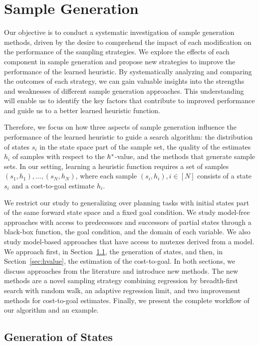 \chapter{Sample Generation}
\label{sec:sampling}

Our objective is to conduct a systematic investigation of sample generation methods, driven by the desire to comprehend the impact of each modification on the performance of the sampling strategies. We explore the effects of each component in sample generation and propose new strategies to improve the performance of the learned heuristic. By systematically analyzing and comparing the outcomes of each strategy, we can gain valuable insights into the strengths and weaknesses of different sample generation approaches. This understanding will enable us to identify the key factors that contribute to improved performance and guide us to a better learned heuristic function.

Therefore, we focus on how three aspects of sample generation influence the performance of the learned heuristic to guide a search algorithm: the distribution of states $s_i$ in the state space part of the sample set, the quality of the estimates $h_i$ of samples with respect to the $h^{*}$-value, and the methods that generate sample sets. In our setting, learning a heuristic function requires a set of samples $(s_1,h_1),\ldots,(s_N,h_N)$, where each sample $(s_i,h_i), i\in[N]$ consists of a state $s_i$ and a cost-to-goal estimate $h_i$.

We restrict our study to generalizing over planning tasks with initial states part of the same forward state space and a fixed goal condition. We study model-free approaches with access to predecessors and successors of partial states through a black-box function, the goal condition, and the domain of each variable. We also study model-based approaches that have access to mutexes derived from a \sas model. We approach first, in Section~\ref{sec:generation}, the generation of states, and then, in Section~\ref{sec:hvalue}, the estimation of the cost-to-goal. In both sections, we discuss approaches from the literature and introduce new methods. The new methods are a novel sampling strategy combining regression by breadth-first search with random walk, an adaptive regression limit, and two improvement methods for cost-to-goal estimates. Finally, we present the complete workflow of our algorithm and an example.

\section{Generation of States}
\label{sec:generation}

